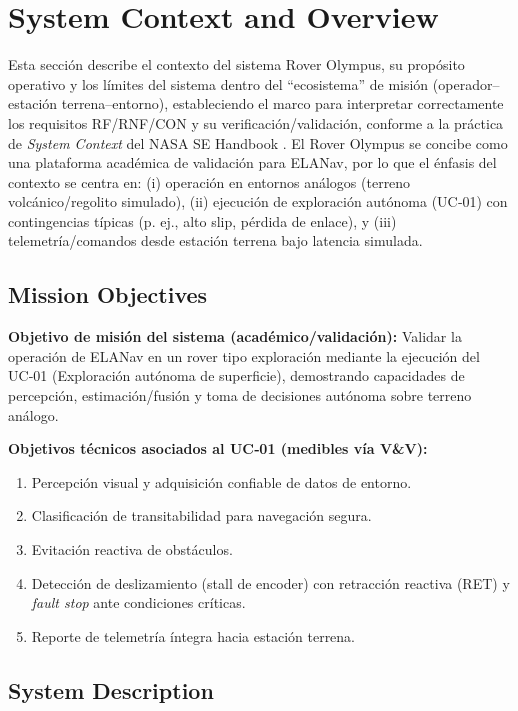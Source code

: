 
\section{System Context and Overview}\label{sec:system_context}

Esta sección describe el contexto del sistema Rover Olympus, su propósito operativo y los límites del sistema dentro del ``ecosistema'' de misión (operador--estación terrena--entorno), estableciendo el marco para interpretar correctamente los requisitos RF/RNF/CON y su verificación/validación, conforme a la práctica de \emph{System Context} del NASA SE Handbook \cite{nasa_se_handbook}.
El Rover Olympus se concibe como una plataforma académica de validación para ELANav, por lo que el énfasis del contexto se centra en: (i) operación en entornos análogos (terreno volcánico/regolito simulado), (ii) ejecución de exploración autónoma (UC‑01) con contingencias típicas (p. ej., alto slip, pérdida de enlace), y (iii) telemetría/comandos desde estación terrena bajo latencia simulada.

\subsection{Mission Objectives}\label{subsec:mission_objectives}

\textbf{Objetivo de misión del sistema (académico/validación):} Validar la operación de ELANav en un rover tipo exploración mediante la ejecución del UC‑01 (Exploración autónoma de superficie), demostrando capacidades de percepción, estimación/fusión y toma de decisiones autónoma sobre terreno análogo.

\textbf{Objetivos técnicos asociados al UC‑01 (medibles vía V\&V):}
\begin{enumerate}
    \item Percepción visual y adquisición confiable de datos de entorno.
    \item Clasificación de transitabilidad para navegación segura.
    \item Evitación reactiva de obstáculos.
    \item Detección de deslizamiento (stall de encoder) con retracción reactiva (RET) y \emph{fault stop} ante condiciones críticas.
    \item Reporte de telemetría íntegra hacia estación terrena.
\end{enumerate}

\subsection{System Description}\label{subsec:system_description}

